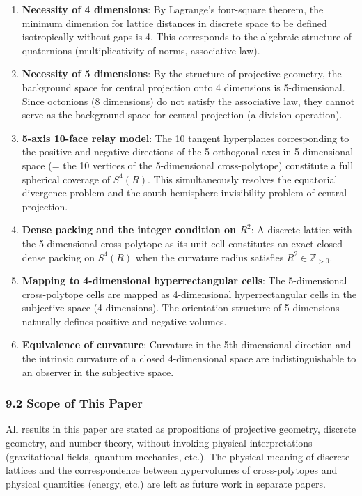 \documentclass[a4paper,11pt]{article}
\begin{document}
\begin{enumerate}
\def\labelenumi{\arabic{enumi}.}
\item
  \textbf{Necessity of 4 dimensions}: By Lagrange's four-square theorem,
  the minimum dimension for lattice distances in discrete space to be
  defined isotropically without gaps is 4. This corresponds to the
  algebraic structure of quaternions (multiplicativity of norms,
  associative law).
\item
  \textbf{Necessity of 5 dimensions}: By the structure of projective
  geometry, the background space for central projection onto 4
  dimensions is 5-dimensional. Since octonions (8 dimensions) do not
  satisfy the associative law, they cannot serve as the background space
  for central projection (a division operation).
\item
  \textbf{5-axis 10-face relay model}: The 10 tangent hyperplanes
  corresponding to the positive and negative directions of the 5
  orthogonal axes in 5-dimensional space (= the 10 vertices of the
  5-dimensional cross-polytope) constitute a full spherical coverage of
  \(S^4(R)\). This simultaneously resolves the equatorial divergence
  problem and the south-hemisphere invisibility problem of central
  projection.
\item
  \textbf{Dense packing and the integer condition on \(R^2\)}: A
  discrete lattice with the 5-dimensional cross-polytope as its unit
  cell constitutes an exact closed dense packing on \(S^4(R)\) when the
  curvature radius satisfies \(R^2 \in \mathbb{Z}_{>0}\).
\item
  \textbf{Mapping to 4-dimensional hyperrectangular cells}: The
  5-dimensional cross-polytope cells are mapped as 4-dimensional
  hyperrectangular cells in the subjective space (4 dimensions). The
  orientation structure of 5 dimensions naturally defines positive and
  negative volumes.
\item
  \textbf{Equivalence of curvature}: Curvature in the 5th-dimensional
  direction and the intrinsic curvature of a closed 4-dimensional space
  are indistinguishable to an observer in the subjective space.
\end{enumerate}

\subsubsection{9.2 Scope of This Paper}\label{scope-of-this-paper}

All results in this paper are stated as propositions of projective
geometry, discrete geometry, and number theory, without invoking
physical interpretations (gravitational fields, quantum mechanics,
etc.). The physical meaning of discrete lattices and the correspondence
between hypervolumes of cross-polytopes and physical quantities (energy,
etc.) are left as future work in separate papers.
\end{document}
